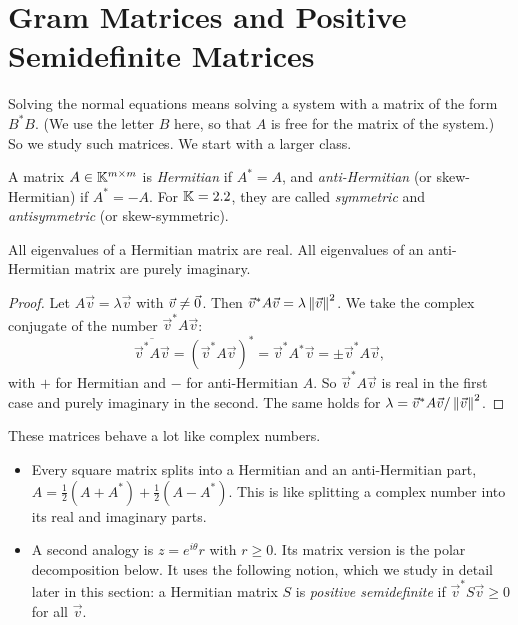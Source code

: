 \clearpage
\section{Gram Matrices and Positive Semidefinite Matrices}

Solving the normal equations means solving a system with a matrix of the form $B^\ast B$. (We use the letter $B$ here, so that $A$ is free for the matrix of the system.) So we study such matrices. We start with a larger class.

\begin{definition}
  A matrix $A \in \mathbb{K}^{m \times m}$ is \emph{Hermitian} if $A^\ast = A$, and \emph{anti-Hermitian} (or skew-Hermitian) if $A^\ast = -A$. For $\mathbb{K} = 2.2$, they are called \emph{symmetric} and \emph{antisymmetric} (or skew-symmetric).
\end{definition}

\begin{proposition}
  \label{prop:herm-eig}
  All eigenvalues of a Hermitian matrix are real. All eigenvalues of an anti-Hermitian matrix are purely imaginary.
\end{proposition}

\begin{proof}
  Let $A\vec{v} = \lambda\vec{v}$ with $\vec{v} \ne \vec{0}$. Then $\vec{v}^\ast A\vec{v} = \lambda\left\lVert \vec{v} \right\rVert^2$. We take the complex conjugate of the number $\vec{v}^\ast A\vec{v}$:
  \begin{equation}
    \overline{\vec{v}^\ast A\vec{v}} = (\vec{v}^\ast A\vec{v})^\ast = \vec{v}^\ast A^\ast\vec{v} = \pm\vec{v}^\ast A\vec{v},
  \end{equation}
  with $+$ for Hermitian and $-$ for anti-Hermitian $A$. So $\vec{v}^\ast A\vec{v}$ is real in the first case and purely imaginary in the second. The same holds for $\lambda = \vec{v}^\ast A\vec{v}/\left\lVert \vec{v} \right\rVert^2$.
\end{proof}

These matrices behave a lot like complex numbers.
\begin{itemize}
  \item Every square matrix splits into a Hermitian and an anti-Hermitian part, $A = \frac{1}{2}(A + A^\ast) + \frac{1}{2}(A - A^\ast)$. This is like splitting a complex number into its real and imaginary parts.
  \item A second analogy is $z = e^{i\theta}r$ with $r \ge 0$. Its matrix version is the polar decomposition below. It uses the following notion, which we study in detail later in this section: a Hermitian matrix $S$ is \emph{positive semidefinite} if $\vec{v}^\ast S\vec{v} \ge 0$ for all $\vec{v}$.
\end{itemize}

